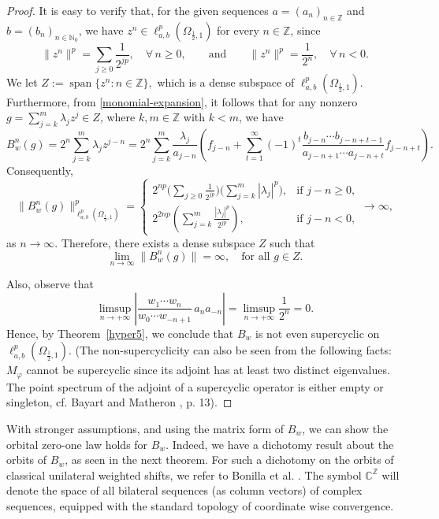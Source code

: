 \documentclass[12pt, reqno]{amsart}
\theoremstyle{definition}
\theoremstyle{remark}
\numberwithin{equation}{section}
\begin{document}
\begin{proof}
It is easy to verify that, for the given sequences 
$a = (a_n)_{n \in \mathbb{Z}}$ and 
$b = (b_n)_{n \in \mathbb{N}_0}$, we have 
$z^n \in \ell^p_{a,b}(\Omega_{\frac{1}{2},1})$ for every $n \in \mathbb{Z}$, since
\[
\|z^{n}\|^{p}
=
\sum_{j\geq 0}\frac{1}{2^{jp}}, 
\quad \forall\, n\geq 0,
\qquad \text{and} \qquad
\|z^{n}\|^{p}
=\frac{1}{2^{n}}, 
\quad \forall\, n<0.
\]
We let $Z:=\operatorname{span}\{z^{n} : n \in \mathbb{Z}\},$ which is a dense subspace of $\ell^p_{a,b}(\Omega_{\frac{1}{2},1})$. Furthermore, from \eqref{monomial-expansion}, it follows that for any nonzero $g=\sum_{j=k}^{m}\lambda_j z^{j} \in Z$, where $k,m \in \mathbb{Z}$ with $k<m$, we have
\[
B_{w}^{n}(g)=2^{n}\sum_{j=k}^{m}\lambda_j z^{j-n}=2^{n}\sum_{j=k}^{m}
\frac{\lambda_j}{a_{j-n}} \left(f_{j-n}+\sum_{t=1}^{\infty}
 (-1)^t\frac{b_{j-n}\cdots b_{j-n+t-1}}{a_{j-n+1}\cdots a_{j-n+t}}f_{j-n+t}\right).
\]
Consequently,
\[
\|B_{w}^{n}(g)\|^{p}_{\ell^p_{a,b}(\Omega_{\frac{1}{2},1})}
=
\begin{cases}
\displaystyle 2^{np}\Big(\sum_{j\geq 0}\frac{1}{2^{jp}}\Big)\Big(\sum_{j=k}^{m}|\lambda_{j}|^{p}\Big), 
 & \text{if } j-n\ge 0,\\[0.6em]
2^{2np}\left(\sum_{j=k}^{m}\frac{|\lambda_{j}|^{p}}{2^{jp}}\right), 
 & \text{if } j-n <0,
\end{cases}
\longrightarrow \infty,
\]
as $n \to \infty$. Therefore, there exists a dense subspace $Z$ such that
\[
\lim_{n\to\infty}\|B_w^n(g)\|=\infty,
\quad \text{for all } g \in Z.
\]

Also, observe that  
\[
\limsup_{n\to +\infty} 
\left\lvert 
\frac{w_{1}\cdots w_{n}}{w_{0}\cdots w_{-n+1}}
\, a_{n}a_{-n}
\right\rvert
= 
\limsup_{n\to +\infty} \frac{1}{2^{n}}
= 0.
\]
Hence, by Theorem~\ref{hyper5}, we conclude that \(B_w\) is not even supercyclic on \(\ell^p_{a,b}(\Omega_{\frac{1}{2},1})\). (The non-supercyclicity can also be seen from the following facts: $M_{\varphi}$ cannot be supercyclic since its adjoint has at least two distinct eigenvalues. The point spectrum of the adjoint of a supercyclic operator is either empty or singleton, cf. Bayart and Matheron \cite{Bayart-Matheron}, p. 13).
 \end{proof}

With stronger assumptions, and using the matrix form of $B_w$, we can show the orbital zero-one law holds for $B_w$. Indeed, we have a dichotomy result about the orbits of $B_w$, as seen in the next theorem. For such a dichotomy on the orbits of classical unilateral weighted shifts, we refer to Bonilla et al. \cite{Bonilla-Cardeccia}. The symbol $\mathbb{C}^{\mathbb{Z}}$ will denote the space of all bilateral sequences (as column vectors) of complex sequences, equipped with the standard topology of coordinate wise convergence. 
 
\end{document}
